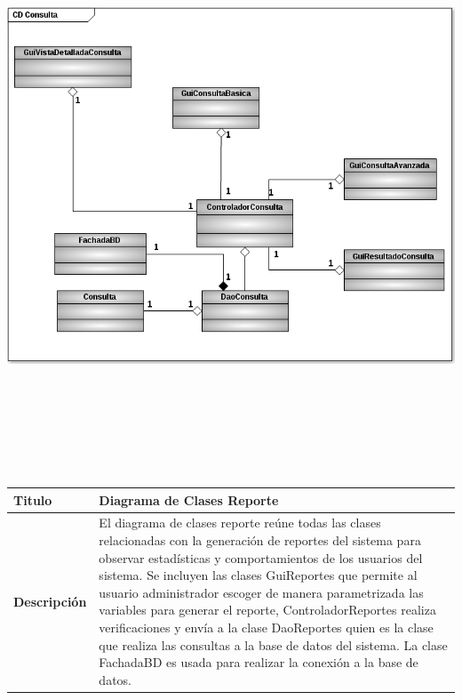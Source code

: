 	\begin{minipage}[c]{1\linewidth}
	\centering
	\includegraphics[width=20cm, height=17cm, angle=90]{diagramasClase/DiagramaClases3}
	\end{minipage}
			
	
			
	
		
	\begin{tabular}{|p{5cm}|p{11cm}|}\hline
	{\bf Titulo} & {Diagrama de Clases Reporte}\\
	\hline
	{\bf Descripción} & {El diagrama de clases reporte reúne todas las clases
	relacionadas con la generación de reportes del sistema para observar estadísticas y
	comportamientos de los usuarios del sistema.\newline
	Se incluyen las clases GuiReportes que permite al usuario administrador escoger de manera
	parametrizada las variables para generar el reporte, ControladorReportes realiza
	verificaciones y envía a la clase DaoReportes quien es la clase que realiza las consultas a
	la base de datos del sistema. La clase FachadaBD es usada para realizar la conexión a la
	base de datos.}\\
	\hline
	\end{tabular}\\[.5cm]
		
